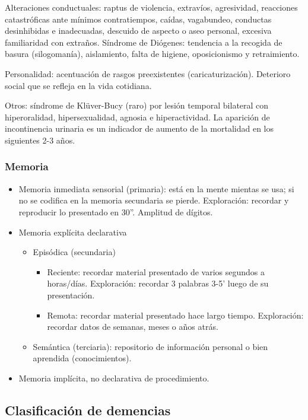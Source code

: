 Alteraciones conductuales: raptus de violencia, extravíos, agresividad, reacciones catastróficas ante mínimos contratiempos, caídas, vagabundeo, conductas desinhibidas e inadecuadas, descuido de aspecto o aseo personal, excesiva familiaridad con extraños. Síndrome de Diógenes: tendencia a la recogida de basura (silogomanía), aislamiento, falta de higiene, oposicionismo y retraimiento.

Personalidad: acentuación de rasgos preexistentes (caricaturización). Deterioro social que se refleja en la vida cotidiana.

Otros: síndrome de Klüver-Bucy (raro) por lesión temporal bilateral con hiperoralidad, hipersexualidad, agnosia e hiperactividad. La aparición de incontinencia urinaria es un indicador de aumento de la mortalidad en los siguientes 2-3 años.
\subsubsection*{Memoria}
\begin{itemize}
	\item Memoria inmediata sensorial (primaria): está en la mente mientas se usa; si no se codifica en la memoria secundaria se pierde. Exploración: recordar y reproducir lo presentado en 30”. Amplitud de dígitos.
	\item Memoria explícita declarativa
	\begin{itemize}
		\item Episódica (secundaria)
		\begin{itemize}
			\item Reciente: recordar material presentado de varios segundos a horas/días. Exploración: recordar 3 palabras 3-5’ luego de su presentación.
			\item Remota: recordar material presentado hace largo tiempo. Exploración: recordar datos de semanas, meses o años atrás.
		\end{itemize}
		\item Semántica (terciaria): repositorio de información personal o bien aprendida (conocimientos).
	\end{itemize}
	\item Memoria implícita, no declarativa de procedimiento.
\end{itemize}
\subsection*{Clasificación de demencias}
